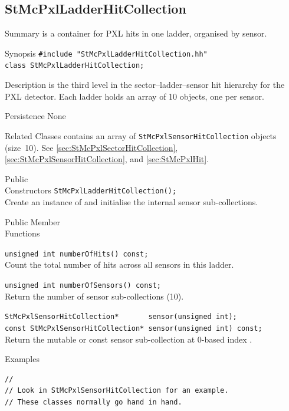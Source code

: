 \subsection{StMcPxlLadderHitCollection}
 
\label{sec:StMcPxlLadderHitCollection}
\begin{Entry}
\item[Summary]
     is a container for PXL hits in one
    ladder, organised by sensor.

\item[Synopsis]
    \verb+#include "StMcPxlLadderHitCollection.hh"+\\
    \verb+class StMcPxlLadderHitCollection;+\\

\item[Description]
     is the third level in the
    sector--ladder--sensor hit hierarchy for the PXL detector.  Each
    ladder holds an array of 10  objects,
    one per sensor.

\item[Persistence]
    None

\item[Related Classes]
     contains an array of
    {\tt StMcPxlSensorHitCollection} objects (size~10).  See
     \ref{sec:StMcPxlSectorHitCollection},
     \ref{sec:StMcPxlSensorHitCollection},
    and  \ref{sec:StMcPxlHit}.

\item[Public\\ Constructors]
    \verb+StMcPxlLadderHitCollection();+\\
    Create an instance of  and
    initialise the internal sensor sub-collections.

\item[Public Member\\ Functions]

    \verb+unsigned int numberOfHits() const;+\\
    Count the total number of hits across all sensors in this ladder.

    \verb+unsigned int numberOfSensors() const;+\\
    Return the number of sensor sub-collections (10).

    \verb+StMcPxlSensorHitCollection*       sensor(unsigned int);+\\
    \verb+const StMcPxlSensorHitCollection* sensor(unsigned int) const;+\\
    Return the mutable or const sensor sub-collection at 0-based index
    .

\item[Examples]
{\footnotesize
\begin{verbatim}
//
// Look in StMcPxlSensorHitCollection for an example.
// These classes normally go hand in hand.
\end{verbatim}
}%
\end{Entry}
